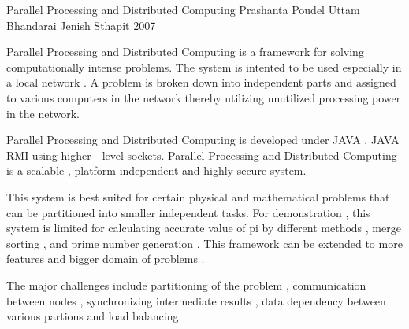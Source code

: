  \begin{conf-abstract}[]
{Parallel Processing and Distributed Computing }
{
           Prashanta Poudel
           Uttam Bhandarai
           Jenish Sthapit
}
{ 2007 }

Parallel Processing and Distributed Computing is a framework for solving computationally intense problems. The system is intented to be used especially in a local network . A problem is broken down into independent parts and assigned to various computers in the network thereby utilizing unutilized processing power in the network.

Parallel Processing and Distributed Computing is developed under JAVA , JAVA RMI using higher - level sockets. Parallel Processing and Distributed Computing is a scalable , platform independent and highly secure system.

This system is best suited for certain physical and mathematical problems that can be partitioned into smaller independent tasks. For demonstration , this system is limited for calculating accurate value of pi by different  methods , merge sorting , and prime number generation . This framework can be extended to more features and bigger domain of problems .

The major challenges include partitioning of the problem , communication between nodes , synchronizing intermediate results , data dependency between various partions and load balancing.
  \end{conf-abstract}
